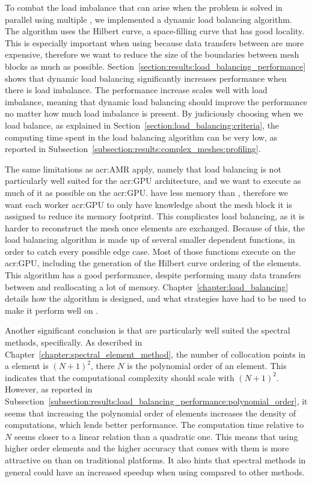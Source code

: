 To combat the load imbalance that can arise when the problem is solved in parallel using multiple
, we implemented a dynamic load balancing algorithm. The algorithm uses the
Hilbert curve, a space-filling curve that has good locality. This is especially important when using
 because data transfers between  are more expensive,
therefore we want to reduce the size of the boundaries between mesh blocks as much as possible. 
Section~\ref{section:results:load_balancing_performance} shows that dynamic load balancing
significantly increases performance when there is load imbalance. The performance increase scales
well with load imbalance, meaning that dynamic load balancing should improve the performance no
matter how much load imbalance is present. By judiciously choosing when we load balance, as
explained in Section~\ref{section:load_balancing:criteria}, the computing time spent in the load
balancing algorithm can be very low, as reported in
Subsection~\ref{subsection:results:complex_meshes:profiling}. 

The same limitations as \acrshort{acr:AMR} apply, namely that load balancing is not particularly
well suited for the \acrshort{acr:GPU} architecture, and we want to execute as much of it as
possible on the \acrshort{acr:GPU}.  have less memory than ,
therefore we want each worker \acrshort{acr:GPU} to only have knowledge about the mesh block it is
assigned to reduce its memory footprint. This complicates load balancing, as it is harder to
reconstruct the mesh once elements are exchanged. Because of this, the load balancing algorithm is
made up of several smaller dependent functions, in order to catch every possible edge case. Most of
those functions execute on the \acrshort{acr:GPU}, including the generation of the Hilbert curve
ordering of the elements. This algorithm has a good performance, despite performing many data
transfers between  and reallocating a lot of memory.
Chapter~\ref{chapter:load_balancing} details how the algorithm is designed, and what strategies have
had to be used to make it perform well on .

Another significant conclusion is that  are particularly well suited the
spectral methods, specifically. As described in Chapter~\ref{chapter:spectral_element_method}, the
number of collocation points in a element is \({\left( N + 1 \right)}^2\), there \(N\) is the
polynomial order of an element. This indicates that the computational complexity should scale with
\({\left( N + 1 \right)}^2\). However, as reported in
Subsection~\ref{subsection:results:load_balancing_performance:polynomial_order}, it seems that
increasing the polynomial order of elements increases the density of computations, which lends
better performance. The computation time relative to \(N\) seems closer to a linear relation than a
quadratic one. This means that using higher order elements and the higher accuracy that comes with
them is more attractive on  than on traditional platforms. It also hints that
spectral methods in general could have an increased speedup when using  compared
to other methods.

